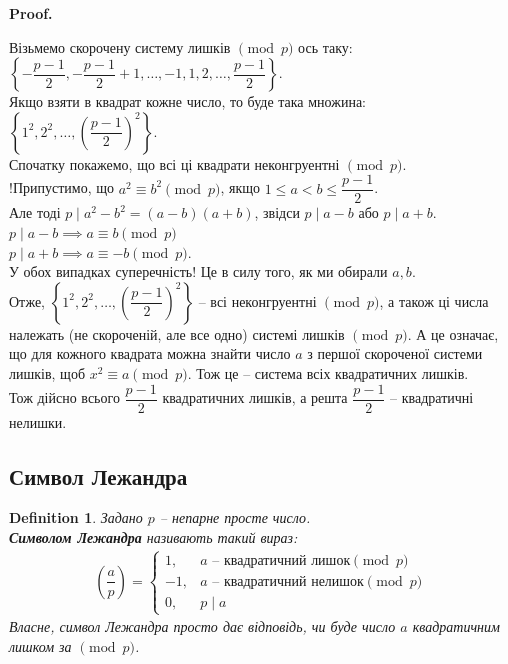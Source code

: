 \documentclass[a4paper, 10pt]{article}
\makeatletter
\theoremstyle{theoremdd}
\theoremstyle{theoremdd}
\newtheorem{definition}[theorem]{Definition}
\theoremstyle{theoremdd}
\theoremstyle{theoremdd}
\theoremstyle{theoremdd}
\theoremstyle{theoremdd}
\theoremstyle{theoremdd}
\theoremstyle{theoremdd}
\renewenvironment{proof}[1][Proof.\\]{\par
\pushQED{\hfill \qed}%
\normalfont \topsep6\p@\@plus6\p@\relax
\trivlist
\item\relax
{\bfseries
#1\@addpunct{.}}\hspace\labelsep\ignorespaces
}{%
\popQED\endtrivlist\@endpefalse
}
\makeatother
\begin{document}
\begin{proof}
Візьмемо скорочену систему лишків $\!\! \pmod p$ ось таку: \\ $\left\{ -\dfrac{p-1}{2}, -\dfrac{p-1}{2}+1,\dots, -1,1,2,\dots,\dfrac{p-1}{2} \right\}$.\\
Якщо взяти в квадрат кожне число, то буде така множина:\\
$\left\{1^2,2^2,\dots, \left( \dfrac{p-1}{2} \right)^2 \right\}$.\\
Спочатку покажемо, що всі ці квадрати неконгруентні $\!\! \pmod p$.\\
!Припустимо, що $a^2 \equiv b^2 \pmod p$, якщо $1 \leq a < b \leq \dfrac{p-1}{2}$.\\
Але тоді $p \mid a^2-b^2 = (a-b)(a+b)$, звідси $p \mid a-b$ або $p \mid a+b$.\\
$p \mid a-b \implies a \equiv b \pmod p$\\
$p \mid a+b \implies a \equiv -b \pmod p$.\\
У обох випадках суперечність! Це в силу того, як ми обирали $a,b$.\\
Отже, $\left\{1^2,2^2,\dots, \left( \dfrac{p-1}{2} \right)^2 \right\}$ -- всі неконгруентні $\!\! \pmod p$, а також ці числа належать (не скороченій, але все одно) системі лишків $\!\! \pmod p$. А це означає, що для кожного квадрата можна знайти число $a$ з першої скороченої системи лишків, щоб $x^2 \equiv a \pmod p$. Тож це -- система всіх квадратичних лишків.\\
Тож дійсно всього $\dfrac{p-1}{2}$ квадратичних лишків, а решта $\dfrac{p-1}{2}$ -- квадратичні нелишки.
\end{proof}

\subsection{Символ Лежандра}
\begin{definition}
Задано $p$ -- непарне просте число.\\
\textbf{Символом Лежандра} називають такий вираз:
\begin{align*}
\left( \dfrac{a}{p} \right) = \begin{cases} 1, & a \text{ -- квадратичний лишок} \!\! \pmod p \\ -1 , & a \text{ -- квадратичний нелишок} \!\! \pmod p \\ 0, & p \mid a \end{cases}
\end{align*}
Власне, символ Лежандра просто дає відповідь, чи буде число $a$ квадратичним лишком за $\!\! \pmod p$.
\end{definition}
\end{document}

